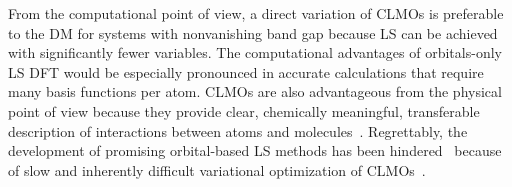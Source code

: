 \documentclass[aps,prl,twocolumn,reprint,amsmath,amssymb]{revtex4-1}
\begin{document}

From the computational point of view, a direct variation of CLMOs is preferable to the DM for systems with nonvanishing band gap because LS can be achieved with significantly fewer variables. 
The computational advantages of orbitals-only LS DFT would be especially pronounced in accurate calculations that require many basis functions per atom. 
CLMOs are also advantageous from the physical point of view because they provide clear, chemically meaningful, transferable description of interactions between atoms and molecules~\cite{stoll1980use, mo2000energy, khaliullin2007unravelling, khaliullin2013microscopic, mo2014block}. 
Regrettably, the development of promising orbital-based LS methods has been hindered~\cite{peng2013effective,tsuchida2008ab, fattebert-recent} because of slow and inherently difficult variational optimization of CLMOs~\cite{mauri1993orbital,ordejon1995linear,goedecker1999linear, fattebert2004linear, peng2013effective, tsuchida2008ab, weitao-yang}. 
%
\end{document}
